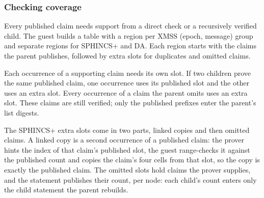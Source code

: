 \subsubsection{Checking coverage}\label{sec:rec-coverage}

Every published claim needs support from a direct check or a recursively verified child. The guest builds a table with a region per XMSS (epoch, message) group and separate regions for SPHINCS+ and DA. Each region starts with the claims the parent publishes, followed by extra slots for duplicates and omitted claims.

Each occurrence of a supporting claim needs its own slot. If two children prove the same published claim, one occurrence uses its published slot and the other uses an extra slot. Every occurrence of a claim the parent omits uses an extra slot. These claims are still verified; only the published prefixes enter the parent's list digests.

The SPHINCS+ extra slots come in two parts, linked copies and then omitted claims. A linked copy is a second occurrence of a published claim: the prover hints the index of that claim's published slot, the guest range-checks it against the published count and copies the claim's four cells from that slot, so the copy is exactly the published claim. The omitted slots hold claims the prover supplies, and the statement publishes their count, per node: each child's count enters only the child statement the parent rebuilds.

